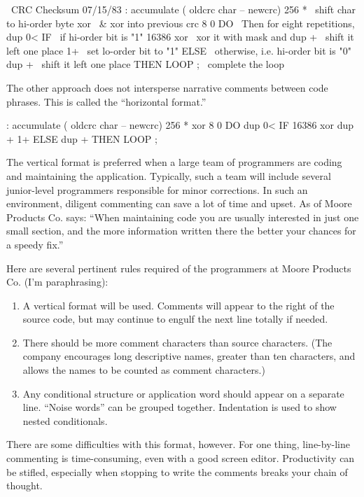 \begin{Code}
\ CRC Checksum                                      07/15/83
: accumulate   ( oldcrc char -- newcrc)
   256 *               \ shift char to hi-order byte
   xor                 \ & xor into previous crc
   8 0 DO              \ Then for eight repetitions,
       dup 0< IF       \ if hi-order bit is "1"
          16386 xor    \ xor it with mask and
          dup +        \ shift it left one place
          1+           \ set lo-order bit to "1"
              ELSE     \ otherwise, i.e. hi-order bit is "0"
          dup +        \ shift it left one place
              THEN
       LOOP ;          \ complete the loop
\end{Code}
The other approach does not intersperse narrative comments between
code phrases.  This is called the ``horizontal format.''
\begin{Code}
: accumulate  ( oldcrc char -- newcrc)
   256 *  xor  8 0 DO  dup 0< IF
      16386 xor  dup +  1+  ELSE  dup +  THEN  LOOP ;
\end{Code}
The vertical format is preferred when a large team of programmers are
coding and maintaining the application.  Typically, such a team will
include several junior-level programmers responsible for minor
corrections.  In such an environment, diligent commenting can save a
lot of time and upset.  As  of Moore
Products Co.  says: ``When maintaining code you are usually interested
in just one small section, and the more information written there the
better your chances for a speedy fix.''

Here are several pertinent rules required of the \Forth{} programmers
at Moore Products Co. (I'm paraphrasing):

\begin{enumerate}
\item A vertical format will be used.  Comments will appear to the
right of the source code, but may continue to engulf the next line
totally if needed.
\item There should be more comment characters than source characters.
(The company encourages long descriptive names, greater than ten
characters, and allows the names to be counted as comment characters.)
\item Any conditional structure or application word should appear on a
separate line.  ``Noise words'' can be grouped together.  Indentation
is used to show nested conditionals.
\end{enumerate}
There are some difficulties with this format, however.%
For one thing, line-by-line commenting is time-consuming, even with a
good screen editor.  Productivity can be stifled, especially when
stopping to write the comments breaks your chain of thought.

